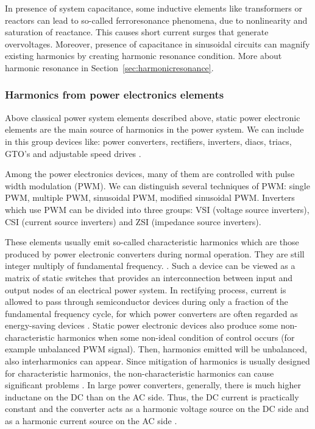 \documentclass[12pt]{report} %
\begin{document}
In presence of system capacitance, some inductive elements like transformers or reactors can lead to so-called ferroresonance phenomena, due to nonlinearity and saturation of reactance. This causes short current surges that generate overvoltages. Moreover, presence of capacitance in sinusoidal circuits can magnify existing harmonics by creating harmonic resonance condition. More about harmonic resonance in Section~\ref{sec:harmonicresonance}.

\subsubsection{Harmonics from power electronics elements}
Above classical power system elements described above, static power electronic elements are the main source of harmonics in the power system. We can include in this group devices like: power converters, rectifiers, inverters, diacs, triacs, GTO’s and adjustable speed drives \cite{das}.

Among the power electronics devices, many of them are controlled with pulse width modulation (PWM). We can distinguish several techniques of PWM: single PWM, multiple PWM, sinusoidal PWM, modified sinusoidal PWM. Inverters which use PWM can be divided into three groups: VSI (voltage source inverters), CSI (current source inverters) and ZSI (impedance source inverters).

These elements usually emit so-called characteristic harmonics which are those produced by power electronic converters during normal operation. They are still integer multiply of fundamental frequency. \cite{das}. Such a device can be viewed as a matrix of static switches that provides an interconnection between input and output nodes of an electrical power system. In rectifying process, current is allowed to pass through semiconductor devices during only a fraction of the fundamental frequency cycle, for which power converters are often regarded as energy-saving devices \cite{rosa}.
Static power electronic devices also produce some non-characteristic harmonics when some non-ideal condition of control occurs (for example unbalanced PWM signal). Then, harmonics emitted will be unbalanced, also interharmonics can appear. Since mitigation of harmonics is usually designed for characteristic harmonics, the non-characteristic harmonics can cause significant problems \cite{das}.
In large power converters, generally, there is much higher inductane on the DC than on the AC side. Thus, the DC current is practically constant and the converter acts as a harmonic voltage source on the DC side and as a harmonic current source on the AC side \cite{rosa}.
\end{document}

